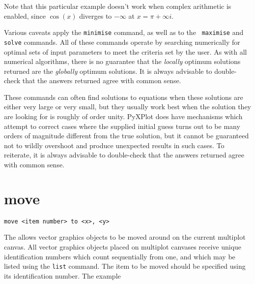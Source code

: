 \vspace{3mm}
\newline
{}\newline
{}\newline
{}\newline
{}
\vspace{3mm}

\noindent Note that this particular example doesn't work when complex
arithmetic is enabled, since $\cos(x)$ diverges to $-\infty$ at $x=\pi+\infty
i$.

Various caveats apply the {\tt minimise} command, as well as to the {\tt
maximise} and {\tt solve} commands.  All of these commands operate by searching
numerically for optimal sets of input parameters to meet the criteria set by
the user. As with all numerical algorithms, there is no guarantee that the {\it
locally} optimum solutions returned are the {\it globally} optimum solutions.
It is always advisable to double-check that the answers returned agree with
common sense.

These commands can often find solutions to equations when these solutions are
either very large or very small, but they usually work best when the solution
they are looking for is roughly of order unity.  PyXPlot does have mechanisms
which attempt to correct cases where the supplied initial guess turns out to be
many orders of magnitude different from the true solution, but it cannot be
guaranteed not to wildly overshoot and produce unexpected results in such
cases.  To reiterate, it is always advisable to double-check that the answers
returned agree with common sense.


\section{move}

\begin{verbatim}
move <item number> to <x>, <y>
\end{verbatim}

The  allows vector graphics objects to be moved around on the
current multiplot canvas. All vector graphics objects placed on multiplot
canvases receive unique identification numbers which count sequentially from
one, and which may be listed using the {\tt list} command. The item to be moved
should be specified using its identification number. The example

